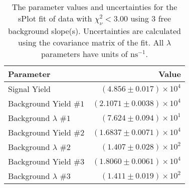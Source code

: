 
\begin{table}
    \begin{center}
        \begin{tabular}{lr}\toprule
            Parameter & Value \\\midrule
            Signal Yield & $(4.856 \pm 0.017) \times 10^{4}$ \\
            Background Yield $\#1$ & $(2.1071 \pm 0.0038) \times 10^{4}$ \\
            Background $\lambda$ $\#1$ & $(7.624 \pm 0.094) \times 10^{1}$ \\
            Background Yield $\#2$ & $(1.6837 \pm 0.0071) \times 10^{4}$ \\
            Background $\lambda$ $\#2$ & $(1.407 \pm 0.028) \times 10^{2}$ \\
            Background Yield $\#3$ & $(1.8060 \pm 0.0061) \times 10^{4}$ \\
            Background $\lambda$ $\#3$ & $(1.411 \pm 0.019) \times 10^{2}$ \\\bottomrule
        \end{tabular}
        \caption{The parameter values and uncertainties for the sPlot fit of data with $\chi^2_\nu < 3.00$ using 3 free background slope(s). Uncertainties are calculated using the covariance matrix of the fit. All $\lambda$ parameters have units of $\si{\nano\second}^{-1}$.}
    \end{center}
\end{table}
